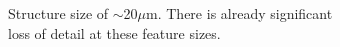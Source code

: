 \begin{figure}[htb]
    \centering
    \begin{subfigure}[t]{0.32\linewidth}
  	    \caption{Structure size of $\sim$20$\mu$m. There is already significant loss of detail at these feature sizes.}
  	    \label{fig:b2d36_q36}
    \end{subfigure}
    \hfill
    \begin{subfigure}[t]{0.32\linewidth}

\end{subfigure}
\end{figure}
